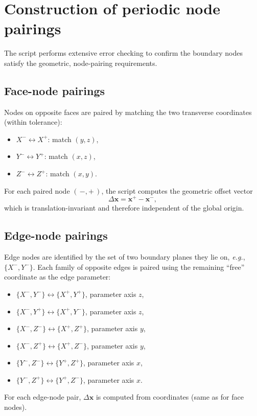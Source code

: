 \documentclass[11pt]{article}
\newcommand{\eg}{\emph{e.g.},\xspace}
\begin{document}
\section{Construction of periodic node pairings}
The script performs extensive error checking to confirm the
boundary nodes satisfy the geometric, node-pairing requirements.
\subsection{Face-node pairings}
Nodes on opposite faces are paired by matching the two transverse coordinates (within tolerance):
\begin{itemize}
\item $X^{-}\leftrightarrow X^{+}$: match $(y,z)$,
\item $Y^{-}\leftrightarrow Y^{+}$: match $(x,z)$,
\item $Z^{-}\leftrightarrow Z^{+}$: match $(x,y)$.
\end{itemize}
For each paired node $(\,-,+\,)$, the script computes the geometric offset vector
\begin{equation}
\Delta \mathbf{x} = \mathbf{x}^{+}-\mathbf{x}^{-},
\end{equation}
which is translation-invariant and therefore independent of the global origin.



\subsection{Edge-node pairings}

Edge nodes are identified by the set of two boundary planes they lie on, \eg\ $\{X^{-},Y^{-}\}$.
Each family of opposite edges is paired using the remaining ``free'' coordinate as the edge parameter:
\begin{itemize}
\item $\{X^{-},Y^{-}\}\leftrightarrow\{X^{+},Y^{+}\}$, parameter axis $z$,
\item $\{X^{-},Y^{+}\}\leftrightarrow\{X^{+},Y^{-}\}$, parameter axis $z$,
\item $\{X^{-},Z^{-}\}\leftrightarrow\{X^{+},Z^{+}\}$, parameter axis $y$,
\item $\{X^{-},Z^{+}\}\leftrightarrow\{X^{+},Z^{-}\}$, parameter axis $y$,
\item $\{Y^{-},Z^{-}\}\leftrightarrow\{Y^{+},Z^{+}\}$, parameter axis $x$,
\item $\{Y^{-},Z^{+}\}\leftrightarrow\{Y^{+},Z^{-}\}$, parameter axis $x$.
\end{itemize}
For each edge-node pair, $\Delta\mathbf{x}$ is computed from
coordinates (same as for face nodes).
\end{document}
